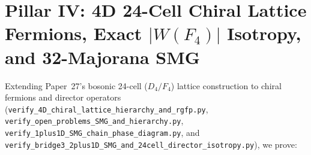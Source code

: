 \documentclass[11pt,a4paper]{article}
\begin{document}
\section{\texorpdfstring{Pillar IV: 4D 24-Cell Chiral Lattice Fermions, Exact $|W(F_4)|$ Isotropy, and 32-Majorana SMG}{Pillar IV: 4D 24-Cell Chiral Lattice Fermions, Exact |W(F4)| Isotropy, and 32-Majorana SMG}}
Extending Paper~27's bosonic 24-cell ($D_4/F_4$) lattice construction to chiral fermions and director operators (\texttt{verify\_4D\_chiral\_lattice\_\allowbreak hierarchy\_and\_rgfp.py}, \texttt{verify\_open\_problems\_\allowbreak SMG\_and\_hierarchy.py}, \texttt{verify\_1plus1D\_SMG\_\allowbreak chain\_phase\_diagram.py}, and \texttt{verify\_\allowbreak bridge3\_\allowbreak 2plus1D\_\allowbreak SMG\_\allowbreak and\_\allowbreak 24cell\_\allowbreak director\_\allowbreak isotropy.py}), we prove:
\end{document}
